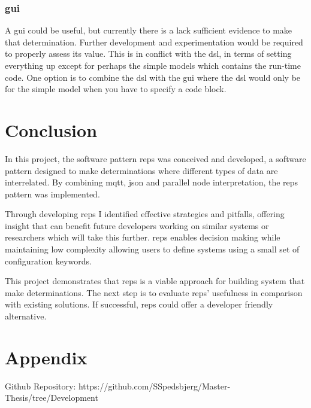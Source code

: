 \documentclass[a4paper,8pt]{article}
\begin{document}
		
		\subsubsection{\gls{gui}}
			A \gls{gui} could be useful, but currently there is a lack sufficient evidence to make that determination. Further development and experimentation would be required to properly assess its value. This is in conflict with the \gls{dsl}, in terms of setting everything up except for perhaps the simple models which contains the run-time code. One option is to combine the \gls{dsl} with the \gls{gui} where the \gls{dsl} would only be for the simple model when you have to specify a code block.
	
	\newpage
	\section{Conclusion}
		In this project, the software pattern \gls{reps} was conceived and developed, a software pattern designed to make determinations where different types of data are interrelated. By combining \gls{mqtt}, \gls{json} and parallel node interpretation, the \gls{reps} pattern was implemented.
		
		Through developing \gls{reps} I identified effective strategies and pitfalls, offering insight that can benefit future developers working on similar systems or researchers which will take this further. \gls{reps} enables decision making while maintaining low complexity allowing users to define systems using a small set of configuration keywords.
		
		This project demonstrates that \gls{reps} is a viable approach for building system that make determinations. The next step is to evaluate \gls{reps}' usefulness in comparison with existing solutions. If successful, \gls{reps} could offer a developer friendly alternative.
		\newpage
	\section{Appendix}
	Github Repository: https://github.com/SSpedsbjerg/Master-Thesis/tree/Development
\end{document}
